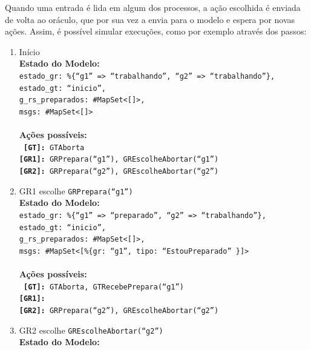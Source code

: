 Quando uma entrada é lida em algum dos processos, a ação escolhida é enviada de
volta ao oráculo, que por sua vez a envia para o modelo e espera por novas
ações. Assim, é possível simular execuções, como por exemplo através dos passos:

\begin{enumerate}
\item Início\\
  \textbf{Estado do Modelo:} \texttt{\small \\
    estado\_gr:\ \%\{``g1'' =\textgreater{} ``trabalhando'', ``g2'' =\textgreater{}
    ``trabalhando''\},\\
    estado\_gt:\ ``inicio'',\\
    g\_rs\_preparados:\ \#MapSet\textless{}[]\textgreater{},\\
    msgs:\ \#MapSet\textless{}[]\textgreater{}\\\\}
  \textbf{Ações possíveis:}\\\texttt{
    \textbf{[GT]:}\ GTAborta\\
    \textbf{[GR1]:}\ GRPrepara(``g1''), GREscolheAbortar(``g1'')\\
    \textbf{[GR2]:}\ GRPrepara(``g2''), GREscolheAbortar(``g2'')\\}
\item GR1 escolhe \texttt{GRPrepara(``g1'')}\\
  \textbf{Estado do Modelo:} \texttt{\small \\
    estado\_gr:\ \%\{``g1'' =\textgreater{} ``preparado'', ``g2'' =\textgreater{}
    ``trabalhando''\},\\
    estado\_gt:\ ``inicio'',\\
    g\_rs\_preparados:\ \#MapSet\textless{}[]\textgreater{},\\
    msgs:\ \#MapSet\textless{}[\%\{gr:\ ``g1'', tipo:\ ``EstouPreparado'' \}]\textgreater{}\\\\}
  \textbf{Ações possíveis:}\\\texttt{
    \textbf{[GT]:}\ GTAborta, GTRecebePrepara(``g1'')\\
    \textbf{[GR1]:}\ \\
    \textbf{[GR2]:}\ GRPrepara(``g2''), GREscolheAbortar(``g2'')\\}
\item GR2 escolhe \texttt{GREscolheAbortar(``g2'')}\\
  \textbf{Estado do Modelo:} \texttt{\small \\
}
\end{enumerate}

